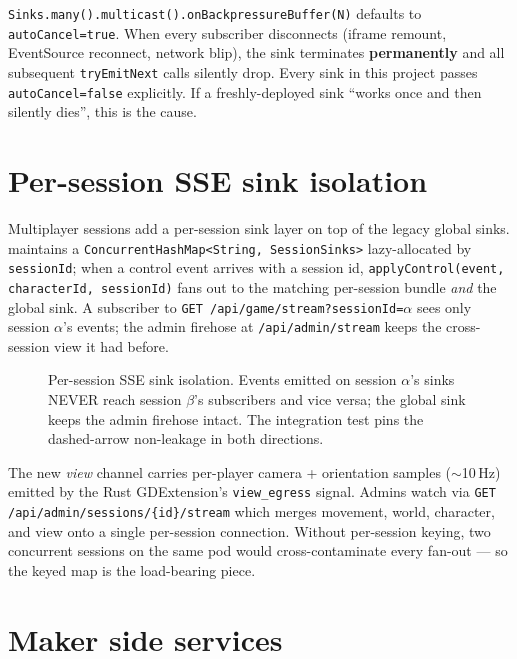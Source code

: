 \begin{snapcaution}[title={The \texttt{autoCancel} trap}]
\texttt{Sinks.many().multicast().onBackpressureBuffer(N)} defaults to
\texttt{autoCancel=true}. When every subscriber disconnects (iframe
remount, EventSource reconnect, network blip), the sink terminates
\textbf{permanently} and all subsequent \texttt{tryEmitNext} calls
silently drop. Every sink in this project passes \texttt{autoCancel=false}
explicitly. If a freshly-deployed sink \enquote{works once and then
silently dies}, this is the cause.
\end{snapcaution}

\section{Per-session SSE sink isolation}

Multiplayer sessions add a per-session sink layer on top of the
legacy global sinks.  maintains a
\texttt{ConcurrentHashMap<String, SessionSinks>} lazy-allocated by
\texttt{sessionId}; when a control event arrives with a session id,
\texttt{applyControl(event, characterId, sessionId)} fans out to the
matching per-session bundle \emph{and} the global sink. A subscriber
to \texttt{GET /api/game/stream?sessionId=$\alpha$} sees only session
$\alpha$'s events; the admin firehose at
\texttt{/api/admin/stream} keeps the cross-session view it had before.

\begin{figure}[!h]
\centering
{}
\caption{Per-session SSE sink isolation. Events emitted on session
$\alpha$'s sinks NEVER reach session $\beta$'s subscribers and vice
versa; the global sink keeps the admin firehose intact. The
integration test pins the dashed-arrow non-leakage in both directions.}
\end{figure}

The new \emph{view} channel carries per-player camera + orientation
samples ($\sim$10\,Hz) emitted by the Rust GDExtension's
\texttt{view\_egress} signal. Admins watch via
\texttt{GET /api/admin/sessions/\{id\}/stream} which merges movement,
world, character, and view onto a single per-session connection.
Without per-session keying, two concurrent sessions on the same pod
would cross-contaminate every fan-out — so the keyed map is the
load-bearing piece.

\section{Maker side services}

